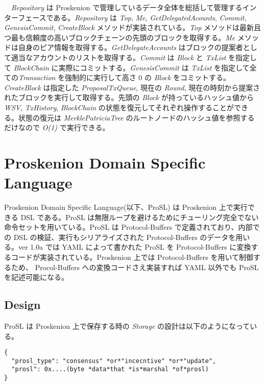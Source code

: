 　\emph{Repository} は Proskenion
で管理しているデータ全体を総括して管理するインターフェースである。\emph{Repository}
は \emph{Top}, \emph{Me}, \emph{GetDelegatedAcounts}, \emph{Commit},
\emph{GenesisCommit}, \emph{CreateBlock}
メソッドが実装されている。\emph{Top}
メソッドは最新且つ最も信頼度の高いブロックチェーンの先頭のブロックを取得する。\emph{Me}
メソッドは自身のピア情報を取得する。\emph{GetDelegateAccounts}
はブロックの提案者として適当なアカウントのリストを取得する。\emph{Commit}
は \emph{Block} と \emph{TxList} を指定して \emph{BlockChain}
に実際にコミットする。\emph{GenesisCommit} は \emph{TxList}
を指定して全ての\emph{Transaction} を強制的に実行して高さ 0 の
\emph{Block} をコミットする。\emph{CreateBlock} は指定した
\emph{ProposalTxQueue}, 現在の \emph{Round},
現在の時刻から提案されたブロックを実行して取得する。先頭の \emph{Block}
が持っているハッシュ値から \emph{WSV}, \emph{TxHistory},
\emph{BlockChain}
の状態を復元してそれぞれ操作することができる。状態の復元は
\emph{MerklePatriciaTree} のルートノードのハッシュ値を参照するだけなので
\emph{O(1)} で実行できる。

\hypertarget{proskenion-domain-specific-language}{%
\section{Proskenion Domain Specific
Language}\label{proskenion-domain-specific-language}}

Proskenion Domain Specific Language(以下、ProSL) は Proskenion
上で実行できる DSL である。ProSL
は無限ループを避けるためにチューリング完全でない命令セットを用いている。ProSL
は Protocol-Buffers で定義されており、内部での DSL
の検証、実行もシリアライズされた Protocol-Buffers のデータを用いる。ver
1.0a では YAML\cite{5} によって書かれた ProSL を Protocol-Buffers
に変換するコードが実装されている。Proskenion 上では Protocol-Buffers
を用いて制御するため、 Procol-Buffers への変換コードさえ実装すれば YAML
以外でも ProSL を記述可能になる。

\hypertarget{design}{%
\subsection{Design}\label{design}}

ProSL は Proskenion 上で保存する時の \emph{Storage}
の設計は以下のようになっている。

\begin{verbatim}
{
  "prosl_type": "consensus" *or*"incecntive" *or*"update",
  "prosl": 0x....(byte *data*that *is*marshal *of*prosl)
}
\end{verbatim}

